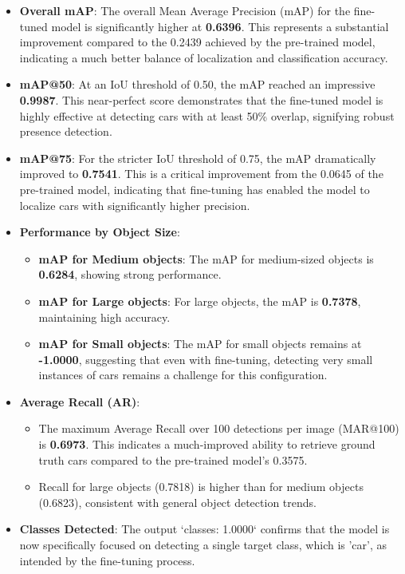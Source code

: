 \documentclass[conference]{IEEEtran}
\begin{document}
\begin{itemize}
    \item \textbf{Overall mAP}: The overall Mean Average Precision (mAP) for the fine-tuned model is significantly higher at \textbf{0.6396}. This represents a substantial improvement compared to the 0.2439 achieved by the pre-trained model, indicating a much better balance of localization and classification accuracy.
    \item \textbf{mAP@50}: At an IoU threshold of 0.50, the mAP reached an impressive \textbf{0.9987}. This near-perfect score demonstrates that the fine-tuned model is highly effective at detecting cars with at least 50\% overlap, signifying robust presence detection.
    \item \textbf{mAP@75}: For the stricter IoU threshold of 0.75, the mAP dramatically improved to \textbf{0.7541}. This is a critical improvement from the 0.0645 of the pre-trained model, indicating that fine-tuning has enabled the model to localize cars with significantly higher precision.
    \item \textbf{Performance by Object Size}:
    \begin{itemize}
        \item \textbf{mAP for Medium objects}: The mAP for medium-sized objects is \textbf{0.6284}, showing strong performance.
        \item \textbf{mAP for Large objects}: For large objects, the mAP is \textbf{0.7378}, maintaining high accuracy.
        \item \textbf{mAP for Small objects}: The mAP for small objects remains at \textbf{-1.0000}, suggesting that even with fine-tuning, detecting very small instances of cars remains a challenge for this configuration.
    \end{itemize}
    \item \textbf{Average Recall (AR)}:
    \begin{itemize}
        \item The maximum Average Recall over 100 detections per image (MAR@100) is \textbf{0.6973}. This indicates a much-improved ability to retrieve ground truth cars compared to the pre-trained model's 0.3575.
        \item Recall for large objects (0.7818) is higher than for medium objects (0.6823), consistent with general object detection trends.
    \end{itemize}
    \item \textbf{Classes Detected}: The output `classes: 1.0000` confirms that the model is now specifically focused on detecting a single target class, which is 'car', as intended by the fine-tuning process.
\end{itemize}
\end{document}
